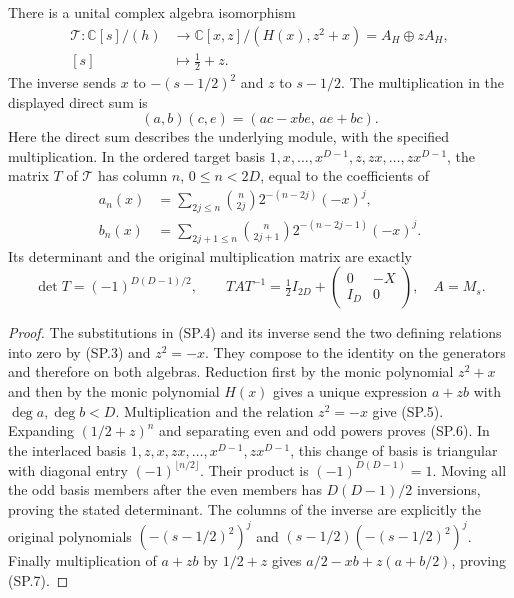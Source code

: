 \begin{theorem}
There is a unital complex algebra isomorphism
\[
 \begin{aligned}
 \mathcal T:\mathbb C[s]/(h)&\longrightarrow
       \mathbb C[x,z]/(H(x),z^2+x)=A_H\oplus zA_H,\\
 [s]&\longmapsto\tfrac12+z.
 \end{aligned}
 \tag{SP.4}
\]
The inverse sends \(x\) to \(-(s-1/2)^2\) and \(z\) to \(s-1/2\).
The multiplication in the displayed direct sum is
\[
 (a,b)(c,e)=(ac-xbe,\,ae+bc).
 \tag{SP.5}
\]
Here the direct sum describes the underlying module, with the
specified multiplication. In the ordered target basis
\(1,x,\ldots,x^{D-1},z,zx,\ldots,zx^{D-1}\), the matrix \(T\)
of \(\mathcal T\) has column \(n\), \(0\le n<2D\), equal to the
coefficients of
\[
 \begin{aligned}
 a_n(x)&=\sum_{2j\le n}\binom n{2j}
                       2^{-(n-2j)}(-x)^j,\\
 b_n(x)&=\sum_{2j+1\le n}\binom n{2j+1}
                       2^{-(n-2j-1)}(-x)^j.
 \end{aligned}
 \tag{SP.6}
\]
Its determinant and the original multiplication matrix are exactly
\[
 \det T=(-1)^{D(D-1)/2},\qquad
 T A T^{-1}=\tfrac12 I_{2D}
                    +\begin{pmatrix}0&-X\\I_D&0\end{pmatrix},
 \quad A=M_s.
 \tag{SP.7}
\]
\end{theorem}

\begin{proof}
The substitutions in (SP.4) and its inverse send the two defining
relations into zero by (SP.3) and \(z^2=-x\). They compose to the
identity on the generators and therefore on both algebras. Reduction
first by the monic polynomial \(z^2+x\) and then by the monic
polynomial \(H(x)\) gives a unique expression \(a+zb\) with
\(\deg a,\deg b<D\). Multiplication and the relation \(z^2=-x\)
give (SP.5). Expanding \((1/2+z)^n\) and separating even and odd
powers proves (SP.6). In the interlaced basis
\(1,z,x,zx,\ldots,x^{D-1},zx^{D-1}\), this change of basis is
triangular with diagonal entry \((-1)^{\lfloor n/2\rfloor}\).
Their product is \((-1)^{D(D-1)}=1\). Moving all the odd basis
members after the even members has \(D(D-1)/2\) inversions, proving
the stated determinant. The columns of the inverse are explicitly
the original polynomials \((-(s-1/2)^2)^j\) and
\((s-1/2)(-(s-1/2)^2)^j\). Finally multiplication of \(a+zb\)
by \(1/2+z\) gives \(a/2-xb+z(a+b/2)\), proving (SP.7).
\end{proof}

